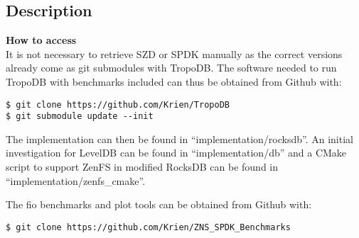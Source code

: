 \subsection{Description}
\textbf{How to access}\\
It is not necessary to retrieve SZD or SPDK manually as the correct versions already come as git submodules with TropoDB. The software needed to run TropoDB with benchmarks included can thus be obtained from Github with:

\begin{verbatim}
$ git clone https://github.com/Krien/TropoDB
$ git submodule update --init
\end{verbatim}
The implementation can then be found in ``implementation/rocksdb''. An initial investigation for LevelDB can be found in ``implementation/db'' 
and a CMake script to support ZenFS in modified RocksDB can be found in ``implementation/zenfs\_cmake''.

The fio benchmarks and plot tools can be obtained from Github with:
\begin{verbatim}
$ git clone https://github.com/Krien/ZNS_SPDK_Benchmarks
\end{verbatim}

